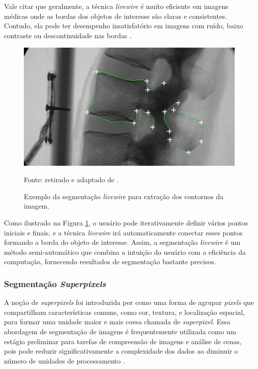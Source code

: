 Vale citar que geralmente, a técnica \textit{livewire} é muito eficiente em imagens médicas onde as bordas dos objetos de interesse são claras e consistentes. Contudo, ela pode ter desempenho insatisfatório em imagens com ruído, baixo contraste ou descontinuidade nas bordas \citep{Falcao1997Paradigmas3D-Live-Wire}.

\begin{figure}[H]
    \centering
    \caption{Exemplo da segmentação \textit{livewire} para extração dos contornos da imagem.}
    \label{segment:fig:livewire}
    \includegraphics[width=0.8\linewidth]{recursos/imagens/image_seg/livewire.png}
    
    Fonte: retirado e adaptado de \cite{Zheng2011ScaledFluoroscopy}.
\end{figure}

Como ilustrado na Figura \ref{segment:fig:livewire}, o usuário pode iterativamente definir vários pontos iniciais e finais, e a técnica \textit{livewire} irá automaticamente conectar esses pontos formando a borda do objeto de interesse. Assim, a segmentação \textit{livewire} é um método semi-automático que combina a intuição do usuário com a eficiência da computação, fornecendo resultados de segmentação bastante precisos.

\subsubsection{Segmentação \textit{Superpixels}}
\label{segment:superpixel}
A noção de \textit{superpixels} foi introduzida por \cite{Ren2003LearningSegmentation} como uma forma de agrupar \textit{pixels} que compartilham características comuns, como cor, textura, e localização espacial, para formar uma unidade maior e mais coesa chamada de \textit{superpixel}. Essa abordagem de segmentação de imagens é frequentemente utilizada como um estágio preliminar para tarefas de compreensão de imagens e análise de cenas, pois pode reduzir significativamente a complexidade dos dados ao diminuir o número de unidades de processamento \citep{Achanta2012SLICMethods}.

